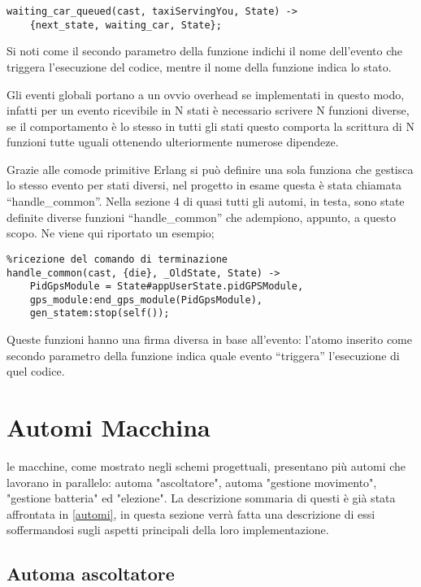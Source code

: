 \begin{lstlisting}
waiting_car_queued(cast, taxiServingYou, State) ->
	{next_state, waiting_car, State};
\end{lstlisting}

Si noti come il secondo parametro della funzione indichi il nome dell'evento che triggera l'esecuzione del codice, mentre il nome della funzione indica lo stato.

Gli eventi globali portano a un ovvio overhead se implementati in questo modo, infatti per un evento ricevibile in N stati è necessario scrivere N funzioni diverse, se il comportamento è lo stesso in tutti gli stati questo comporta la scrittura di N funzioni tutte uguali ottenendo ulteriormente numerose dipendeze.

Grazie alle comode primitive Erlang si può definire una sola funziona che gestisca lo stesso evento per stati diversi, nel progetto in esame questa è stata chiamata ``handle\_common''. Nella sezione 4 di quasi tutti gli automi, in testa, sono state definite diverse funzioni ``handle\_common'' che adempiono, appunto, a questo scopo. Ne viene qui riportato un esempio;

\begin{lstlisting}
%ricezione del comando di terminazione
handle_common(cast, {die}, _OldState, State) ->
	PidGpsModule = State#appUserState.pidGPSModule,
	gps_module:end_gps_module(PidGpsModule),
	gen_statem:stop(self());
\end{lstlisting}

Queste funzioni hanno una firma diversa in base all'evento: l'atomo inserito come secondo parametro della funzione indica quale evento ``triggera'' l'esecuzione di quel codice.

\section{Automi Macchina} \label{automiMacchina}

le macchine, come mostrato negli schemi progettuali, presentano più automi che lavorano in parallelo: automa "ascoltatore", automa "gestione movimento", "gestione batteria" ed "elezione". La descrizione sommaria di questi è già stata affrontata in \ref{automi}, in questa sezione verrà fatta una descrizione di essi soffermandosi sugli aspetti principali della loro implementazione.

\subsection{Automa ascoltatore} \label{automaAscoltatore}

